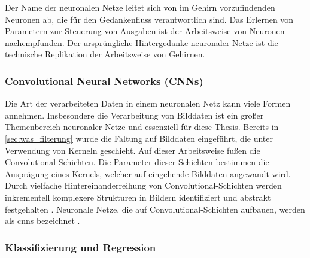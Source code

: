 Der Name der neuronalen Netze leitet sich von im Gehirn vorzufindenden Neuronen ab, die für den Gedankenfluss verantwortlich sind. Das Erlernen von Parametern zur Steuerung von Ausgaben ist der Arbeitsweise von Neuronen nachempfunden. Der ursprüngliche Hintergedanke neuronaler Netze ist die technische Replikation der Arbeitsweise von Gehirnen.

\vspace*{-0.25cm}

\subsubsection{Convolutional Neural Networks (CNNs)}
\label{sec:cnns}

Die Art der verarbeiteten Daten in einem neuronalen Netz kann viele Formen annehmen. Insbesondere die Verarbeitung von Bilddaten ist ein großer Themenbereich neuronaler Netze und essenziell für diese Thesis. Bereits in \autoref{sec:was_filterung} wurde die Faltung auf Bilddaten eingeführt, die unter Verwendung von Kerneln geschieht. Auf dieser Arbeitsweise fußen die Convolutional-Schichten. Die Parameter dieser Schichten bestimmen die Ausprägung eines Kernels, welcher auf eingehende Bilddaten angewandt wird. Durch vielfache Hintereinanderreihung von Convolutional-Schichten werden inkrementell komplexere Strukturen in Bildern identifiziert und abstrakt festgehalten \cite{alexnet}. Neuronale Netze, die auf Convolutional-Schichten aufbauen, werden als \acp{cnn} bezeichnet \cite{cv_general}.

\vspace*{-0.25cm}

\subsubsection{Klassifizierung und Regression}
\label{sec:klassifizierung_regression}

